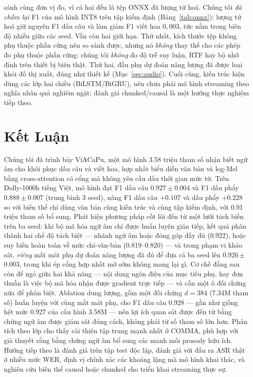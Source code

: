 \documentclass[conference,onecolumn]{IEEEtran}
\begin{document}
sánh cùng đơn vị đo, vì cả hai đều là tệp ONNX đã lượng tử hoá. Chúng tôi
\emph{đã chấm lại} F1 của mô hình INT8 trên tập kiểm định
(Bảng~\ref{tab:onnx}): lượng tử hoá giữ nguyên F1 dấu câu và làm giảm F1 viết
hoa $0{,}003$, tức nằm trong biên độ nhiễu giữa các seed. Vẫn còn hai giới hạn.
Thứ nhất, kích thước tệp không phụ thuộc phần cứng nên so sánh được, nhưng nó
\emph{không} thay thế cho các phép đo phụ thuộc phần cứng: chúng tôi
\emph{không} đo độ trễ suy luận, RTF hay bộ nhớ đỉnh trên thiết bị biên thật.
Thứ hai, đầu phụ dự đoán năng lượng đã được loại khỏi đồ thị xuất, đúng như
thiết kế (Mục~\ref{sec:audio}).
Cuối cùng, kiến trúc hiện dùng
các lớp hai chiều (BiLSTM/BiGRU), nên chưa phải mô hình streaming theo nghĩa nhân
quả nghiêm ngặt; đánh giá chunked/causal là một hướng thực nghiệm tiếp theo.

\section{Kết Luận}
\label{sec:conclusion}

Chúng tôi đã trình bày ViACaPu, một mô hình 3.58 triệu tham số nhận biết ngữ âm cho
khôi phục dấu câu và viết hoa, hợp nhất biểu diễn văn bản và log-Mel bằng
cross-attention có cổng mà không yêu cầu dấu thời gian mức từ. Trên Dolly-1000h
tiếng Việt, mô hình đạt F1 dấu câu $0.927\pm0.004$ và F1 dấu phẩy $0.888\pm0.007$
(trung bình 3 seed), nâng F1 dấu câu $+0.107$ và dấu phẩy $+0.228$ so với biến thể
chỉ dùng văn bản cùng kiến trúc và cùng tập kiểm định, với 0.91 triệu tham số bổ
sung. Phát hiện phương pháp cốt lõi đến từ một lưới tách biến trên ba seed: khi bộ
mã hóa ngữ âm chỉ được huấn luyện gián tiếp, kết quả phân thành hai chế độ tách
biệt --- nhánh ngữ âm hoặc đóng góp đầy đủ (0.922), hoặc suy biến hoàn toàn về mức
chỉ-văn-bản (0.819--0.820) --- và trong phạm vi khảo sát, \emph{riêng} mất mát phụ
dự đoán năng lượng đã đủ để đưa cả ba seed lên 0.926\,$\pm$\,0.003, trong khi ép
cổng hợp nhất mở sớm không mang lại gì. Cơ chế đằng sau còn để ngỏ giữa hai khả
năng --- nội dung ngôn điệu của mục tiêu phụ, hay đơn thuần là việc bộ mã hóa nhận
được gradient trực tiếp --- và cần một ô đối chứng nữa để phân biệt. Ablation dung lượng, gồm một đối chứng $d{=}384$
(7.34M tham số) huấn luyện với cùng mất mát phụ, cho F1 dấu câu 0.928 --- gần
như giống hệt mức 0.927 của cấu hình 3.58M --- nên lợi ích quan sát được đến
từ bằng chứng ngữ âm được giám sát đúng cách, không phải từ số tham số lớn hơn.
Phân tích theo lớp
cho thấy cải thiện tập trung mạnh nhất ở COMMA, phù hợp với giả thuyết rằng bằng
chứng ngữ âm bổ sung các manh mối prosody hữu ích. Hướng tiếp theo là đánh giá trên
tập test độc lập, đánh giá với đầu ra ASR thật ở nhiều mức WER, định vị chính xác
các khoảng lặng mà mô hình khai thác, và nghiên cứu biến thể causal hoặc chunked
cho triển khai streaming thực sự.
\end{document}

